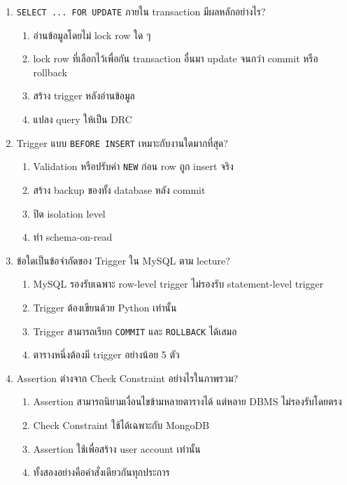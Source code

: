 \documentclass[a4paper,12pt]{article}
\begin{document}
\begin{enumerate}[label=\textbf{\arabic*.}]
    \item \texttt{SELECT ... FOR UPDATE} ภายใน transaction มีผลหลักอย่างไร?
    \begin{enumerate}[label=\alph*.]
        \item อ่านข้อมูลโดยไม่ lock row ใด ๆ
        \item lock row ที่เลือกไว้เพื่อกัน transaction อื่นมา update จนกว่า commit หรือ rollback
        \item สร้าง trigger หลังอ่านข้อมูล
        \item แปลง query ให้เป็น DRC
    \end{enumerate}

    \item Trigger แบบ \texttt{BEFORE INSERT} เหมาะกับงานใดมากที่สุด?
    \begin{enumerate}[label=\alph*.]
        \item Validation หรือปรับค่า \texttt{NEW} ก่อน row ถูก insert จริง
        \item สร้าง backup ของทั้ง database หลัง commit
        \item ปิด isolation level
        \item ทำ schema-on-read
    \end{enumerate}

    \item ข้อใดเป็นข้อจำกัดของ Trigger ใน MySQL ตาม lecture?
    \begin{enumerate}[label=\alph*.]
        \item MySQL รองรับเฉพาะ row-level trigger ไม่รองรับ statement-level trigger
        \item Trigger ต้องเขียนด้วย Python เท่านั้น
        \item Trigger สามารถเรียก \texttt{COMMIT} และ \texttt{ROLLBACK} ได้เสมอ
        \item ตารางหนึ่งต้องมี trigger อย่างน้อย 5 ตัว
    \end{enumerate}

    \item Assertion ต่างจาก Check Constraint อย่างไรในภาพรวม?
    \begin{enumerate}[label=\alph*.]
        \item Assertion สามารถนิยามเงื่อนไขข้ามหลายตารางได้ แต่หลาย DBMS ไม่รองรับโดยตรง
        \item Check Constraint ใช้ได้เฉพาะกับ MongoDB
        \item Assertion ใช้เพื่อสร้าง user account เท่านั้น
        \item ทั้งสองอย่างคือคำสั่งเดียวกันทุกประการ
    \end{enumerate}


\end{enumerate}
\end{document}
